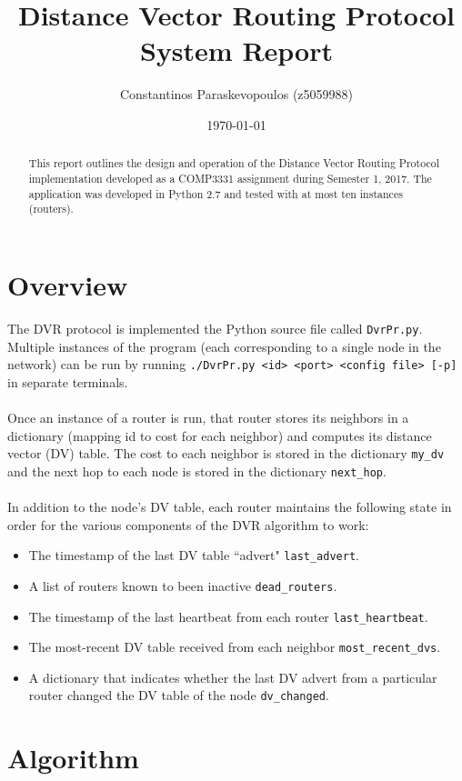 \documentclass[12pt,a4paper]{article}
\title{Distance Vector Routing Protocol \\ \large System Report}
\author{Constantinos Paraskevopoulos (z5059988)}
\date{\today}
\begin{document}
\maketitle

\begin{abstract}
	This report outlines the design and operation of the Distance Vector Routing Protocol implementation developed as a COMP3331 assignment during Semester 1, 2017. The application was developed in Python 2.7 and tested with at most ten instances (routers).
\end{abstract}

\section{Overview}
\label{sec:overview}

The DVR protocol is implemented the Python source file called \verb|DvrPr.py|. Multiple instances of the program (each corresponding to a single node in the network) can be run by running \verb|./DvrPr.py <id> <port> <config file> [-p]| in separate terminals.
\\\\
Once an instance of a router is run, that router stores its neighbors in a dictionary (mapping id to cost for each neighbor) and computes its distance vector (DV) table. The cost to each neighbor is stored in the dictionary \verb|my_dv| and the next hop to each node is stored in the dictionary \verb|next_hop|.
\\\\
In addition to the node's DV table, each router maintains the following state in order for the various components of the DVR algorithm to work:
\begin{itemize}
	\item The timestamp of the last DV table ``advert" \verb|last_advert|.
	\item A list of routers known to been inactive \verb|dead_routers|.
	\item The timestamp of the last heartbeat from each router \verb|last_heartbeat|.
	\item The most-recent DV table received from each neighbor \verb|most_recent_dvs|.
	\item A dictionary that indicates whether the last DV advert from a particular router changed the DV table of the node \verb|dv_changed|.
\end{itemize}

\section{Algorithm}
\label{sec:algorihtm}
\end{document}
